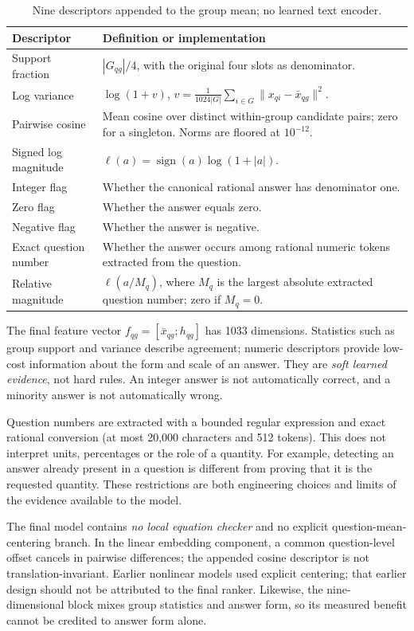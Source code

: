 \documentclass[11pt,a4paper]{article}
\begin{document}
\begin{table}[h]\centering\small
\caption{Nine descriptors appended to the group mean; no learned text encoder.}
\begin{tabularx}{\linewidth}{@{}lX@{}}\toprule
Descriptor & Definition or implementation \\\midrule
Support fraction & $|G_{qg}|/4$, with the original four slots as denominator. \\
Log variance & $\log(1+v)$, $v=\frac{1}{1024|G|}\sum_{i\in G}\|x_{qi}-\bar x_{qg}\|^2$. \\
Pairwise cosine & Mean cosine over distinct within-group candidate pairs; zero for a singleton. Norms are floored at $10^{-12}$. \\
Signed log magnitude & $\ell(a)=\operatorname{sign}(a)\log(1+|a|)$. \\
Integer flag & Whether the canonical rational answer has denominator one. \\
Zero flag & Whether the answer equals zero. \\
Negative flag & Whether the answer is negative. \\
Exact question number & Whether the answer occurs among rational numeric tokens extracted from the question. \\
Relative magnitude & $\ell(a/M_q)$, where $M_q$ is the largest absolute extracted question number; zero if $M_q=0$. \\
\bottomrule\end{tabularx}
\end{table}

The final feature vector $f_{qg}=[\bar x_{qg};h_{qg}]$ has 1033 dimensions.
Statistics such as group support and variance describe agreement; numeric
descriptors provide low-cost information about the form and scale of an answer.
They are \emph{soft learned evidence}, not hard rules. An integer answer is not
automatically correct, and a minority answer is not automatically wrong.

Question numbers are extracted with a bounded regular expression and exact
rational conversion (at most 20,000 characters and 512 tokens). This does not
interpret units, percentages or the role of a quantity. For example, detecting
an answer already present in a question is different from proving that it is the
requested quantity. These restrictions are both engineering choices and limits
of the evidence available to the model.

The final model contains \emph{no local equation checker} and no explicit
question-mean-centering branch. In the linear embedding component, a common
question-level offset cancels in pairwise differences; the appended cosine
descriptor is not translation-invariant. Earlier nonlinear models
used explicit centering; that earlier design should not be attributed to the
final ranker. Likewise, the nine-dimensional block mixes group statistics and
answer form, so its measured benefit cannot be credited to answer form alone.
\end{document}
